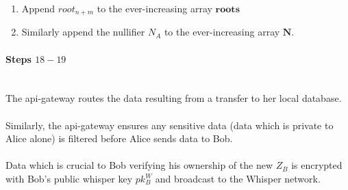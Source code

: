 \documentclass{article}
\DeclarePairedDelimiter\br{(}{)}
\begin{document}
\begin{enumerate}
\begin{align*}
\begin{forest}
{{                  }
                $}
                [{$Z_0$}][{$Z_1$}]
              ]
              [...
                [...][...]
              ]
            ]
            [{$ h\br*{
                  h\br*{
                    Z_{n-1},Z_A
                  },
                  h\br*{
                    Z_{n+1},...
                  }
                }
              $}
              [{$ h\br*{
                    Z_{n-1},Z_A
                  }
                $}
                [{$Z_{n-1}$}][{$Z_A$}]
              ]
              [{$ h\br*{
                    Z_{n+1},...
                  }
                $}
                [$Z_{n+1}$][...]
              ]
            ]
          ]
          [{$ h\br*{
                h\br*{
                  h\br*{
                    Z_{n+m-1}, Z_B
                  },
                  0
                },
                0
              }
            $}
            [{$ h\br*{
                  h\br*{
                    Z_{n+m-1}, Z_B
                  },
                  0
                }
              $}
              [{$ h\br*{
                    Z_{n+m-1}, Z_B
                  }
                $}
                [{$Z_{n+m-1}$}][{$Z_B$}]
              ]
              [0
                [0][0]
              ]
            ]
            [0
              [0
                [0][0]
              ]
              [0
                [0][0]
              ]
            ]
          ]
        ]
      \end{forest}
    \end{align*}

    Note that the Shield contract only needs to calculate the hashes on the path from $Z_B$ to the root.

  \item Append $root_{n+m}$ to the ever-increasing array $\bm{roots}$
  \item Similarly append the nullifier $N_{A}$ to the ever-increasing array $\bm N$.
\end{enumerate}




\paragraph{Steps $18 - 19$}
\ \\
The api-gateway routes the data resulting from a transfer to her local database.\\
\\
Similarly, the api-gateway ensures any sensitive data (data which is private to Alice alone) is filtered before Alice sends data to Bob.\\
\\
Data which is crucial to Bob verifying his ownership of the new $Z_B$ is encrypted with Bob's public whisper key $pk^W_B$ and broadcast to the Whisper network.
\end{document}
